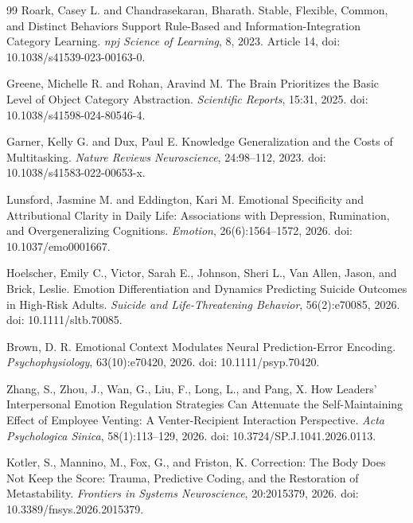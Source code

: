 \documentclass[11pt]{article}
\begin{document}
\begin{thebibliography}{99}
Roark, Casey L. and Chandrasekaran, Bharath.
\newblock Stable, Flexible, Common, and Distinct Behaviors Support Rule-Based and Information-Integration Category Learning.
\newblock \emph{npj Science of Learning}, 8, 2023.
\newblock Article 14, doi: 10.1038/s41539-023-00163-0.

Greene, Michelle R. and Rohan, Aravind M.
\newblock The Brain Prioritizes the Basic Level of Object Category Abstraction.
\newblock \emph{Scientific Reports}, 15:31, 2025.
\newblock doi: 10.1038/s41598-024-80546-4.

Garner, Kelly G. and Dux, Paul E.
\newblock Knowledge Generalization and the Costs of Multitasking.
\newblock \emph{Nature Reviews Neuroscience}, 24:98--112, 2023.
\newblock doi: 10.1038/s41583-022-00653-x.

Lunsford, Jasmine M. and Eddington, Kari M.
\newblock Emotional Specificity and Attributional Clarity in Daily Life: Associations with Depression, Rumination, and Overgeneralizing Cognitions.
\newblock \emph{Emotion}, 26(6):1564--1572, 2026.
\newblock doi: 10.1037/emo0001667.

Hoelscher, Emily C., Victor, Sarah E., Johnson, Sheri L., Van Allen, Jason, and Brick, Leslie.
\newblock Emotion Differentiation and Dynamics Predicting Suicide Outcomes in High-Risk Adults.
\newblock \emph{Suicide and Life-Threatening Behavior}, 56(2):e70085, 2026.
\newblock doi: 10.1111/sltb.70085.

Brown, D. R.
\newblock Emotional Context Modulates Neural Prediction-Error Encoding.
\newblock \emph{Psychophysiology}, 63(10):e70420, 2026.
\newblock doi: 10.1111/psyp.70420.

Zhang, S., Zhou, J., Wan, G., Liu, F., Long, L., and Pang, X.
\newblock How Leaders' Interpersonal Emotion Regulation Strategies Can Attenuate the Self-Maintaining Effect of Employee Venting: A Venter-Recipient Interaction Perspective.
\newblock \emph{Acta Psychologica Sinica}, 58(1):113--129, 2026.
\newblock doi: 10.3724/SP.J.1041.2026.0113.

Kotler, S., Mannino, M., Fox, G., and Friston, K.
\newblock Correction: The Body Does Not Keep the Score: Trauma, Predictive Coding, and the Restoration of Metastability.
\newblock \emph{Frontiers in Systems Neuroscience}, 20:2015379, 2026.
\newblock doi: 10.3389/fnsys.2026.2015379.


\end{thebibliography}
\end{document}

